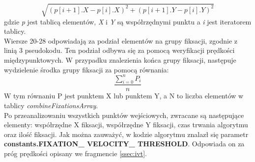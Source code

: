 \[
        \sqrt{(p[i+1].X - p[i].X)^2 + (p[i+1].Y - p[i].Y)^2}
\]
gdzie \emph{p} jest tablicą elementów, \emph{X} i \emph{Y} są współrzędnymi punktu a \emph{i} jest iteratorem tablicy.\\
Wiersze 20-28 odpowiadają za podział elementów na grupy fiksacji, zgodnie z linią 3 pseudokodu. Ten podział odbywa się za pomocą weryfikacji prędkości międzypunktowych. W przypadku znalezienia końca grupy fiksacji, następuje wydzielenie środka grupy fiksacji za pomocą równania:
\[
        \frac{\sum_{i = 0}^{n}{P_i}}{n}
\]
W tym równaniu P jest punktem X lub punktem Y, a N to liczba elementów w tablicy \emph{combineFixationsArray}.\\
Po przeanalizowaniu wszystkich punktów wejściowych, zwracane są następujące elementy: współrzędne X fiksacji, współrzędne Y fiksacji, czas trwania algorytmu oraz ilość fiksacji. Jak można zauważyć, w kodzie algorytmu znalazł się parametr \textbf{constants.FIXATION\_ VELOCITY\_ THRESHOLD}. Odpowiada on za próg prędkości opisany we fragmencie \ref{ssec:ivt}.
